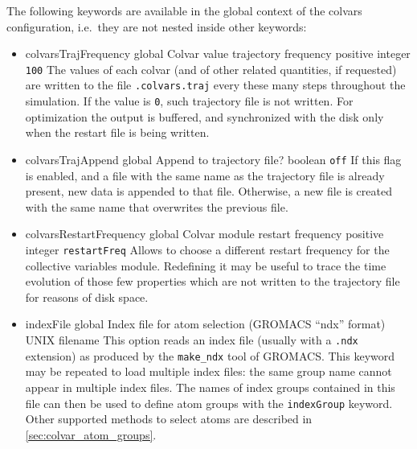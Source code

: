 The following keywords are available in the global context of the colvars configuration, i.e.~they are not nested inside other keywords:
\begin{itemize}

\item %
  \keydef
    {colvarsTrajFrequency}{%
    global}{%
  Colvar value trajectory frequency}{%
    positive integer}{%
    \texttt{100}}{%
    The values of each colvar (and of other related quantities, if requested) are written to the file \outputName\texttt{.colvars.traj} every these many steps throughout the simulation.
    If the value is \texttt{0}, such trajectory file is not written.
    For optimization the output is buffered, and synchronized with the disk only when the restart file is being written.}

\item %
  \keydef
    {colvarsTrajAppend}{%
    global}{%
    Append to trajectory file?}{%
    boolean}{%
    \texttt{off}}{%
    If this flag is enabled, and a file with the same name as the trajectory file is already present, new data is appended to that file.
    Otherwise, a new file is created with the same name that overwrites the previous file.
}

\item %
  \keydef
    {colvarsRestartFrequency}{%
    global}{%
    Colvar module restart frequency}{%
    positive integer}{%
    \texttt{restartFreq}}{%
    Allows to choose a different restart frequency for the collective
    variables module.  Redefining it may be useful to trace the time
    evolution of those few properties which are not written to the
    trajectory file for reasons of disk space.}

\item %
  \key
    {indexFile}{%
    global}{%
    Index file for atom selection (GROMACS ``ndx'' format)}{%
    UNIX filename}{%
    This option reads an index file (usually with a \texttt{.ndx}
    extension) as produced by the \texttt{make\_ndx} tool of GROMACS.
    This keyword may be repeated to load multiple index files: the same group name cannot appear in multiple index files.
    The names of index groups contained in this file can then be used to define
    atom groups with the \texttt{indexGroup} keyword.
    Other supported methods to select atoms are described in \ref{sec:colvar_atom_groups}.
  }


\end{itemize}
